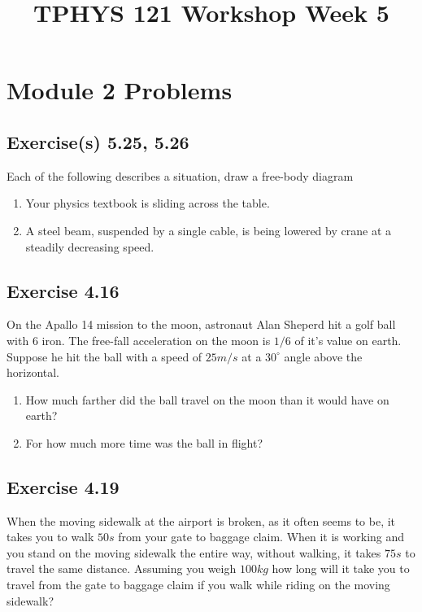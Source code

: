 \documentclass[11pt]{article}
\title{TPHYS 121 Workshop Week 5}
\author{}
\date{\vspace{-5ex}}
\newenvironment{exercise}{
    \begin{mdframed}[style=problemstyle]\textcolor{black}{}
}{
    \end{mdframed}
}
\begin{document}
\maketitle
\vspace{-10ex}%

\section*{Module 2 Problems}
\subsection*{Exercise(s) 5.25, 5.26}
\begin{exercise}
    Each of the following describes a situation, draw a free-body diagram
    \begin{enumerate}[label={\alph*}]
        \item Your physics textbook is sliding across the table. 
        \item A steel beam, suspended by a single cable, is being lowered by 
        crane at a steadily decreasing speed.
    \end{enumerate}
\end{exercise}

\subsection*{Exercise 4.16}
\begin{exercise}
    On the Apallo 14 mission to the moon, astronaut Alan Sheperd hit a golf 
    ball with $6$ iron. The free-fall acceleration on the moon is $1/6$ of 
    it's value on earth. Suppose he hit the ball with a speed of $25m/s$ at 
    a $30^{\circ}$ angle above the horizontal.
    \begin{enumerate}[label={\alph*}]
        \item How much farther did the ball travel on the moon than it would 
        have on earth?
        \item For how much more time was the ball in flight?
    \end{enumerate}
\end{exercise}
\subsection*{Exercise 4.19}
\begin{exercise}
    When the moving sidewalk at the airport is broken, as it often seems to 
    be, it takes you to walk $50s$ from your gate to baggage claim. When it is 
    working and you stand on the moving sidewalk the entire way, without 
    walking, it takes $75s$ to travel the same distance. Assuming you weigh
    $100kg$ how long will it take you to travel from the gate to baggage claim 
    if you walk while riding on the moving sidewalk?
\end{exercise}
\end{document}
